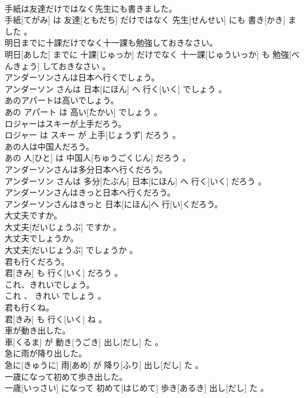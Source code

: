 \documentclass[8pt]{extreport}
\begin{document}
\begin{CJK}{UTF8}{min}
\\	手紙は友達だけではなく先生にも書きました。	
\\	手紙[てがみ] は 友達[ともだち] だけではなく 先生[せんせい] にも 書き[かき] ました 。
\\	明日までに十課だけでなく十一課も勉強しておきなさい。	
\\	明日[あした] までに 十課[じゅっか] だけでなく 十一課[じゅういっか] も 勉強[べんきょう] しておきなさい 。
\\	アンダーソンさんは日本へ行くでしょう。	
\\	アンダーソン さんは 日本[にほん] へ 行く[いく] でしょう 。
\\	あのアパートは高いでしょう。	
\\	あの アパート は 高い[たかい] でしょう 。
\\	ロジャーはスキーが上手だろう。	
\\	ロジャー は スキー が 上手[じょうず] だろう 。
\\	あの人は中国人だろう。	
\\	あの 人[ひと] は 中国人[ちゅうごくじん] だろう 。
\\	アンダーソンさんは多分日本へ行くだろう。	
\\	アンダーソン さんは 多分[たぶん] 日本[にほん] へ 行く[いく] だろう 。
\\	アンダーソンさんはきっと日本へ行くだろう。	
\\	アンダーソンさんはきっと 日本[にほん]へ 行[い]くだろう。
\\	大丈夫ですか。	
\\	大丈夫[だいじょうぶ] ですか 。
\\	大丈夫でしょうか。	
\\	大丈夫[だいじょうぶ] でしょうか 。
\\	君も行くだろう。	
\\	君[きみ] も 行く[いく] だろう 。
\\	これ、きれいでしょう。	
\\	これ 、 きれい でしょう 。
\\	君も行くね。	
\\	君[きみ] も 行く[いく] ね 。
\\	車が動き出した。	
\\	車[くるま] が 動き[うごき] 出し[だし] た 。
\\	急に雨が降り出した。	
\\	急に[きゅうに] 雨[あめ] が 降り[ふり] 出し[だし] た 。
\\	一歳になって初めて歩き出した。	
\\	一歳[いっさい] になって 初めて[はじめて] 歩き[あるき] 出し[だし] た 。

\end{CJK}
\end{document}
